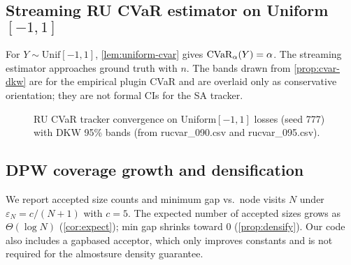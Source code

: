\subsection{Streaming RU CVaR estimator on Uniform$[-1,1]$}
For $Y\sim \mathrm{Unif}[-1,1]$, \cref{lem:uniform-cvar} gives $\mathrm{CVaR}_\alpha(Y)=\alpha$. The streaming estimator approaches ground truth with $n$. The bands drawn from \cref{prop:cvar-dkw} are for the empirical plug\textendash in CVaR and are overlaid only as conservative orientation; they are not formal CIs for the SA tracker.

\begin{figure}[t]
\centering
\begin{adjustbox}{width=\linewidth}
\end{adjustbox}
\caption{RU CVaR tracker convergence on Uniform$[-1,1]$ losses (seed 777) with DKW 95\% bands (from rucvar\_090.csv and rucvar\_095.csv).}
\label{fig:cvar}
\end{figure}

\subsection{DPW coverage growth and densification}
We report accepted size counts and minimum gap vs.\ node visits $N$ under $\varepsilon_N=c/(N+1)$ with $c=5$. The expected number of accepted sizes grows as $\Theta(\log N)$ (\cref{cor:expect}); min gap shrinks toward 0 (\cref{prop:densify}). Our code also includes a gap\textendash based acceptor, which only improves constants and is not required for the almost\textendash sure density guarantee.

